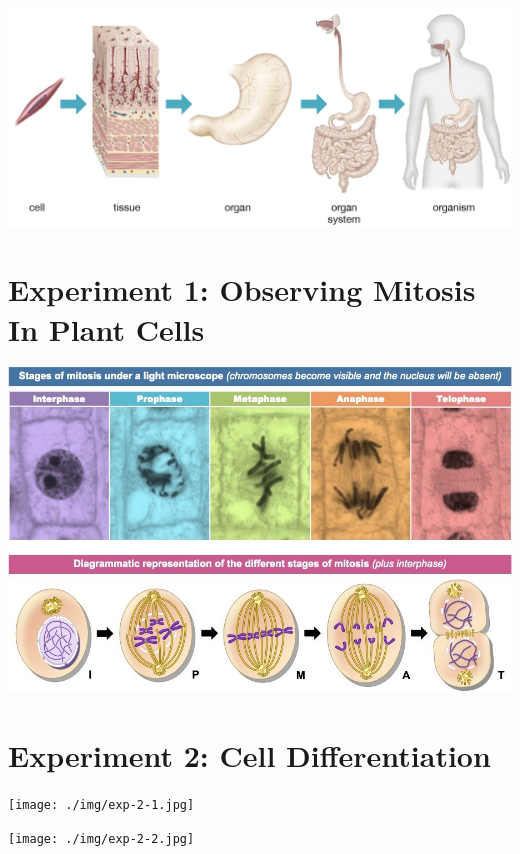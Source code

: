 \documentclass[
]{book}
\begin{document}
\includegraphics{./img/l3.png}

\hypertarget{experiment-1-observing-mitosis-in-plant-cells}{%
\section{Experiment 1: Observing Mitosis In Plant Cells}\label{experiment-1-observing-mitosis-in-plant-cells}}

\includegraphics{./img/exp-1.jpeg}

\hypertarget{experiment-2-cell-differentiation}{%
\section{Experiment 2: Cell Differentiation}\label{experiment-2-cell-differentiation}}

\texttt{[image: ./img/exp-2-1.jpg]}

\texttt{[image: ./img/exp-2-2.jpg]}
\end{document}
